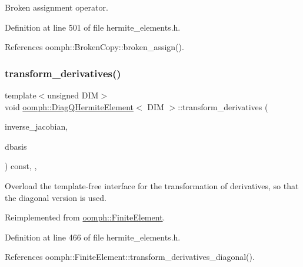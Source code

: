 Broken assignment operator. 



Definition at line 501 of file hermite\+\_\+elements.\+h.



References oomph\+::\+Broken\+Copy\+::broken\+\_\+assign().

\mbox{\label{classoomph_1_1DiagQHermiteElement_abae42df187036728d7d78467509f92af}} 
\subsubsection{\texorpdfstring{transform\+\_\+derivatives()}{transform\_derivatives()}}
{\footnotesize\ttfamily template$<$unsigned D\+IM$>$ \\
void \hyperlink{classoomph_1_1DiagQHermiteElement}{oomph\+::\+Diag\+Q\+Hermite\+Element}$<$ D\+IM $>$\+::transform\+\_\+derivatives (\begin{DoxyParamCaption}\item[{const \hyperlink{classoomph_1_1DenseMatrix}{Dense\+Matrix}$<$ double $>$ \&}]{inverse\+\_\+jacobian,  }\item[{\hyperlink{classoomph_1_1DShape}{D\+Shape} \&}]{dbasis }\end{DoxyParamCaption}) const\hspace{0.3cm}{\ttfamily [inline]}, {\ttfamily [protected]}, {\ttfamily [virtual]}}



Overload the template-\/free interface for the transformation of derivatives, so that the diagonal version is used. 



Reimplemented from \hyperlink{classoomph_1_1FiniteElement_a2c2f243c9f450c4023e5aa4246facd20}{oomph\+::\+Finite\+Element}.



Definition at line 466 of file hermite\+\_\+elements.\+h.



References oomph\+::\+Finite\+Element\+::transform\+\_\+derivatives\+\_\+diagonal().

\mbox{\label{classoomph_1_1DiagQHermiteElement_a6d6dbf192bc9284a87608e2699f8ebb1}} 
